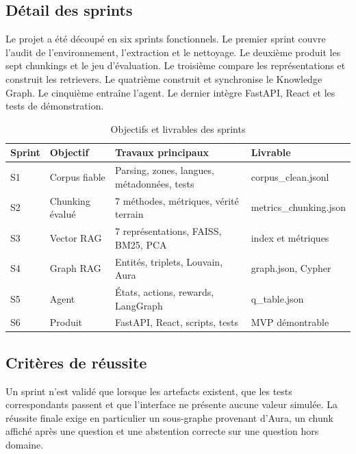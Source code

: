 \documentclass[12pt,a4paper,oneside]{report}
\begin{document}
\subsection{Détail des sprints}
Le projet a été découpé en six sprints fonctionnels. Le premier sprint couvre l'audit de l'environnement, l'extraction et le nettoyage. Le deuxième produit les sept chunkings et le jeu d'évaluation. Le troisième compare les représentations et construit les retrievers. Le quatrième construit et synchronise le Knowledge Graph. Le cinquième entraîne l'agent. Le dernier intègre FastAPI, React et les tests de démonstration.

\begin{table}[H]
\centering
\small
\caption{Objectifs et livrables des sprints}
\begin{tabularx}{\textwidth}{p{}p{}X p{}}
\toprule
\textbf{Sprint} & \textbf{Objectif} & \textbf{Travaux principaux} & \textbf{Livrable}\\
\midrule
S1 & Corpus fiable & Parsing, zones, langues, métadonnées, tests & corpus\_clean.jsonl\\
S2 & Chunking évalué & 7 méthodes, métriques, vérité terrain & metrics\_chunking.json\\
S3 & Vector RAG & 7 représentations, FAISS, BM25, PCA & index et métriques\\
S4 & Graph RAG & Entités, triplets, Louvain, Aura & graph.json, Cypher\\
S5 & Agent & États, actions, rewards, LangGraph & q\_table.json\\
S6 & Produit & FastAPI, React, scripts, tests & MVP démontrable\\
\bottomrule
\end{tabularx}
\end{table}

\subsection{Critères de réussite}
Un sprint n'est validé que lorsque les artefacts existent, que les tests correspondants passent et que l'interface ne présente aucune valeur simulée. La réussite finale exige en particulier un sous-graphe provenant d'Aura, un chunk affiché après une question et une abstention correcte sur une question hors domaine.
\end{document}
